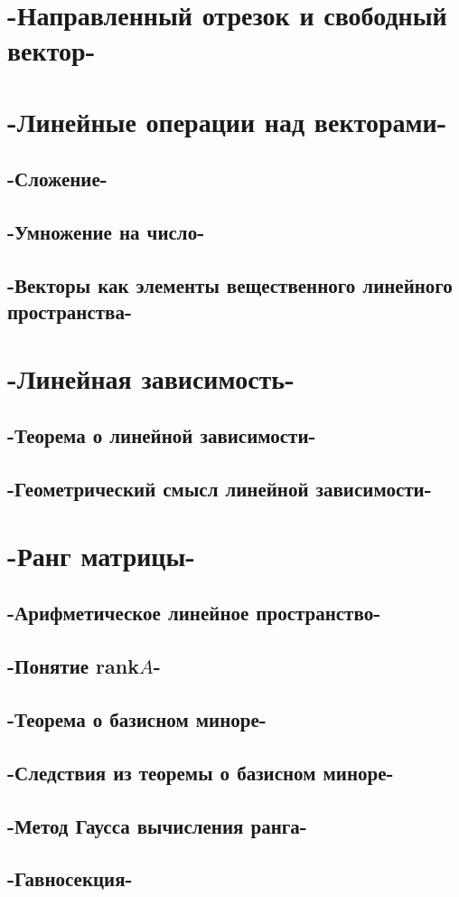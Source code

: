 \chapter{-Направленный отрезок и свободный вектор-}
\chapter{-Линейные операции над векторами-}
\section{-Сложение-}
\section{-Умножение на число-}
\section{-Векторы как элементы вещественного линейного пространства-}
\chapter{-Линейная зависимость-}
\section{-Теорема о линейной зависимости-}
\section{-Геометрический смысл линейной зависимости-}
\chapter{-Ранг матрицы-}
\section{-Арифметическое линейное пространство-}
\section{-Понятие rank$A$-}
\section{-Теорема о базисном миноре-}
\section{-Следствия из теоремы о базисном миноре-}
\section{-Метод Гаусса вычисления ранга-}
\section{-Гавносекция-}
